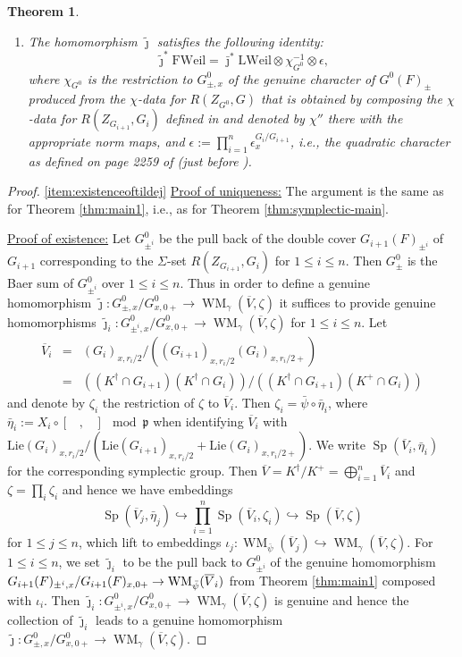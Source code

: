 \documentclass{article}
\def\ol#1{\overline{#1}}
\newcommand{\fp}{\mathfrak{p}}
\DeclareMathOperator{\Sp}{Sp}
\newtheorem{thm}{Theorem}[subsection]
\theoremstyle{definition}
\numberwithin{equation}{subsection}
\renewcommand{\-}{\hyp{}}
\DeclareMathOperator{\WM}{WM}
\begin{document}
\begin{thm}
\begin{enumerate}
		\item\label{item:organbox} The homomorphism $\tilde \jmath$ satisfies the following identity:
		\[ \tilde\jmath^*\mathrm{FWeil} = \bar\jmath^*\mathrm{LWeil} \otimes \chi_{G^0}^{-1} \otimes \epsilon,\] 
		where $\chi_{G^0}$ is the restriction to $G^0_{\pm, x}$ of the genuine character of $G^0(F)_\pm$ produced from the $\chi$-data for $R(Z_{G^0},G)$ that is obtained by composing the $\chi$-data for $R(Z_{G_{i+1}}, G_i)$ defined in \cite[\S4.2]{FKS23} and denoted by $\chi''$ there with the appropriate norm maps, and $\epsilon:=\prod_{i=1}^n\epsilon_x^{G_i/G_{i+1}}$, i.e., the quadratic character as defined on page 2259 of \cite{FKS23} (just before \cite[Theorem~4.1.13]{FKS23}).
	\end{enumerate}
\end{thm}
\begin{proof}
	\ref{item:existenceoftildej} 
	\underline{Proof of uniqueness:} The argument is the same as for Theorem \ref{thm:main1}, i.e., as for Theorem \ref{thm:symplectic-main}. 
	
	\underline{Proof of existence:} 	
	Let $G^0_{\pm^i}$ be the pull back of the double cover $G_{i+1}(F)_{\pm^i}$ of $G_{i+1}$ corresponding to the  $\Sigma$-set $R(Z_{G_{i+1}}, G_i)$ for $1 \leq i \leq n$. Then $G^0_{\pm}$ is the Baer sum of $G^0_{\pm^i}$ over $1 \leq i \leq n$. Thus in order to define a genuine homomorphism $\tilde \jmath : G^0_{\pm, x}/G^0_{x,0+} \to \WM_\gamma(\ol{V}, \zeta)$ it suffices to provide genuine homomorphisms $\tilde \jmath_i: G^0_{\pm^i, x}/G^0_{x,0+} \to \WM_\gamma(\ol{V}, \zeta)$ for $1 \leq i \leq n$. Let 
	\begin{eqnarray*}
		\ol{V}_i &=& (G_i)_{x,r_i/2}/((G_{i+1})_{x,r_i/2}(G_i)_{x,r_i/2+})\\
		&=&((K^\dagger\cap G_{i+1})(K^\dagger\cap G_{i}))/((K^\dagger\cap G_{i+1})(K^+\cap G_{i}))
	\end{eqnarray*}
	and denote by $\zeta_i$ the restriction of $\zeta$ to $\ol{V}_i$. Then $\zeta_i = \bar\psi \circ \bar \eta_i$, where $\bar \eta_i :=X_i \circ [\phantom{X},\phantom{X}] \mod \fp$ when identifying $\ol{V}_i$ with  $\mathrm{Lie}(G_i)_{x,r_i/2}/(\mathrm{Lie}(G_{i+1})_{x,r_i/2}+\mathrm{Lie}(G_i)_{x,r_i/2+})$. We write $\Sp(\ol{V}_i, \bar \eta_i)$ for the corresponding symplectic group.
	Then $\ol{V} = K^\dagger/K^+=\bigoplus_{i=1}^n \ol{V}_i$ and $\zeta = \prod_i \zeta_i$ and hence we have embeddings
	\[\Sp(\ol{V}_j, \bar \eta_j) \hookrightarrow \textstyle\prod_{i=1}^n \Sp(\ol{V}_i,\zeta_i) \hookrightarrow \Sp(\ol{V}, \zeta)\]
	 for $1 \leq j \leq n$, which lift to embeddings $\iota_j: \WM_{\bar\psi}(\ol{V}_j) \hookrightarrow \WM_{\gamma}(\ol{V}, \zeta)$. For $1 \leq i \leq n$, we set $\tilde \jmath_i$ to be the pull back to $G^0_{\pm^i}$ of the genuine homomorphism $G_{i+1}(F)_{\pm^i,x}/G_{i+1}(F)_{x,0+} \ra \WM_{\bar\psi}(\ol{V}_i)$ from Theorem \ref{thm:main1} composed with $\iota_i$. Then $\tilde \jmath_i: G^0_{\pm^i, x}/G^0_{x,0+} \to \WM_\gamma(\ol{V}, \zeta)$ is genuine and hence the collection of $\tilde \jmath_i$ leads to a genuine homomorphism $\tilde \jmath : G^0_{\pm, x}/G^0_{x,0+} \to \WM_\gamma(\ol{V}, \zeta)$.
	

\end{proof}
\end{document}
